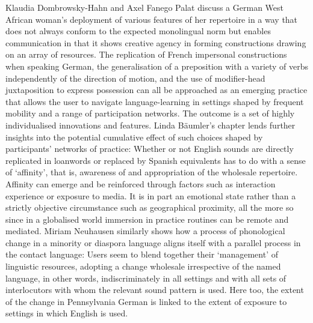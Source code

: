 \documentclass[output=paper]{langscibook}
\begin{document}
Klaudia Dombrowsky-Hahn and Axel Fanego Palat discuss a German West African woman's deployment of various features of her repertoire in a way that does not always conform to the expected monolingual norm but enables communication in that it shows creative agency in forming constructions drawing on an array of resources. The replication of French impersonal constructions when speaking German, the generalisation of a preposition with a variety of verbs independently of the direction of motion, and the use of modifier-head juxtaposition to express possession can all be approached as an emerging practice that allows the user to navigate language-learning in settings shaped by frequent mobility and a range of participation networks. The outcome is a set of highly individualised innovations and features. Linda Bäumler’s chapter lends further insights into the potential cumulative effect of such choices shaped by participants’ networks of practice: Whether or not English sounds are directly replicated in loanwords or replaced by Spanish equivalents has to do with a sense of ‘affinity’, that is, awareness of and appropriation of the wholesale repertoire. Affinity can emerge and be reinforced through factors such as interaction experience or exposure to media. It is in part an emotional state rather than a strictly objective circumstance such as geographical proximity, all the more so since in a globalised world immersion in practice routines can be remote and mediated. Miriam Neuhausen similarly shows how a process of phonological change in a minority or diaspora language aligns itself with a parallel process in the contact language: Users seem to blend together their ‘management’ of linguistic resources, adopting a change wholesale irrespective of the named language, in other words, indiscriminately in all settings and with all sets of interlocutors with whom the relevant sound pattern is used. Here too, the extent of the change in Pennsylvania German is linked to the extent of exposure to settings in which English is used. 
\end{document}
